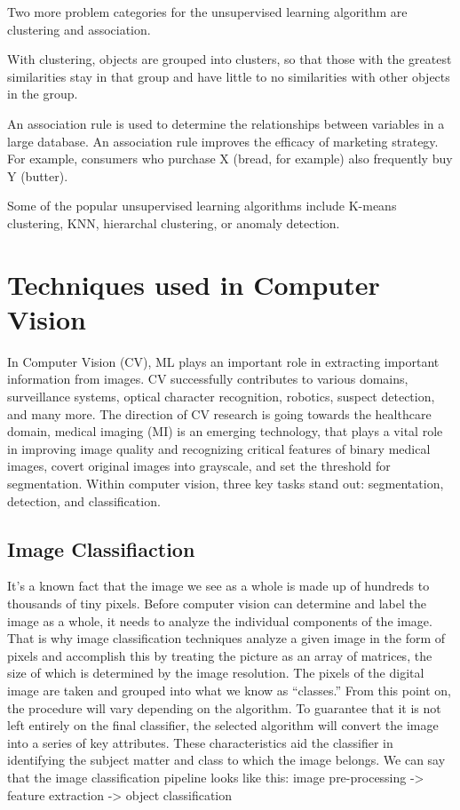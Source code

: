 Two more problem categories for the unsupervised learning algorithm are clustering and association.


With clustering, objects are grouped into clusters, so that those with the greatest similarities stay in that group and have little to no similarities with other objects in the group.


An association rule is used to determine the relationships between variables in a large database. An association rule improves the efficacy of marketing strategy. For example, consumers who purchase X (bread, for example) also frequently buy Y (butter).


Some of the popular unsupervised learning algorithms include K-means clustering, KNN, hierarchal clustering, or anomaly detection.

\section{Techniques used in Computer Vision }
In Computer Vision (CV), ML plays an important role in extracting important information from images. CV successfully contributes to various domains, surveillance systems, optical character recognition, robotics, suspect detection, and many more.  The direction of CV research is going towards the healthcare domain, medical imaging (MI) is an emerging technology, that plays a vital role in improving image quality and recognizing critical features of binary medical images, covert original images into grayscale, and set the threshold for segmentation.
Within computer vision, three key tasks stand out: segmentation, detection, and classification.
\subsection*{Image Classifiaction}
It's a known fact that the image we see as a whole is made up of hundreds to thousands of tiny pixels. Before computer vision can determine and label the image as a whole, it needs to analyze the individual components of the image. That is why image classification techniques analyze a given image in the form of pixels and accomplish this by treating the picture as an array of matrices, the size of which is determined by the image resolution. The pixels of the digital image are taken and grouped into what we know as “classes.” From this point on, the procedure will vary depending on the algorithm. To guarantee that it is not left entirely on the final classifier, the selected algorithm will convert the image into a series of key attributes. These characteristics aid the classifier in identifying the subject matter and class to which the image belongs.
We can say that the image classification pipeline looks like this:
image pre-processing -> feature extraction -> object classification


